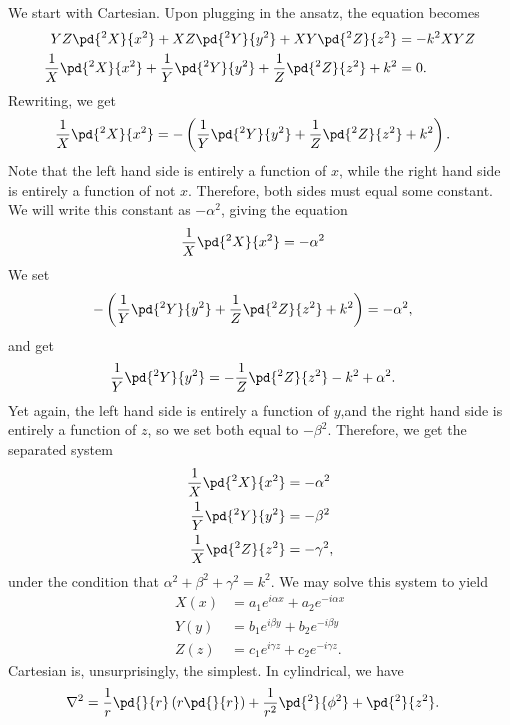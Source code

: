 \documentclass[10pt]{mypackage}
\begin{document}
  We start with Cartesian. Upon plugging in the ansatz, the equation becomes
  \begin{align*}
    YZ\pd{^2X}{x^2} + XZ \pd{^2Y}{y^2} + XY \pd{^2Z}{z^2} &= -k^2XYZ\\
    \frac{1}{X}\pd{^2X}{x^2} + \frac{1}{Y}\pd{^2Y}{y^2} + \frac{1}{Z}\pd{^2Z}{z^2} + k^2 &= 0.
  \end{align*}
  Rewriting, we get
  \begin{align*}
    \frac{1}{X}\pd{^2X}{x^2} &= -\left( \frac{1}{Y}\pd{^2Y}{y^2} + \frac{1}{Z}\pd{^2Z}{z^2} + k^2 \right).
  \end{align*}
  Note that the left hand side is entirely a function of $x$, while the right hand side is entirely a function of not $x$. Therefore, both sides must equal some constant. We will write this constant as $-\alpha^2$, giving the equation
  \begin{align*}
    \frac{1}{X}\pd{^2X}{x^2} &= -\alpha^2
  \end{align*}
  We set
  \begin{align*}
    -\left( \frac{1}{Y}\pd{^2Y}{y^2} + \frac{1}{Z}\pd{^2Z}{z^2} + k^2 \right) &= -\alpha^2,
  \end{align*}
  and get
  \begin{align*}
    \frac{1}{Y} \pd{^2Y}{y^2} &= -\frac{1}{Z}\pd{^2Z}{z^2} - k^2 + \alpha^2.
  \end{align*}
  Yet again, the left hand side is entirely a function of $y$,and the right hand side is entirely a function of $z$, so we set both equal to $-\beta^2$. Therefore, we get the separated system
  \begin{align*}
    \frac{1}{X}\pd{^2X}{x^2} &= -\alpha^2\\
    \frac{1}{Y}\pd{^2Y}{y^2} &= -\beta^2\\
    \frac{1}{X}\pd{^2Z}{z^2} &= -\gamma^2,
  \end{align*}
  under the condition that $\alpha^2 + \beta^2 + \gamma^2 = k^2$. We may solve this system to yield
  \begin{align*}
    X(x) &= a_1e^{i\alpha x} + a_2e^{-i\alpha x}\\
    Y(y) &= b_1e^{i\beta y} + b_2e^{-i\beta y}\\
    Z(z) &= c_1e^{i\gamma z} + c_2e^{-i\gamma z}.
  \end{align*}
  Cartesian is, unsurprisingly, the simplest. In cylindrical, we have
  \begin{align*}
    \nabla^2 &= \frac{1}{r} \pd{}{r}\left( r \pd{}{r} \right) + \frac{1}{r^2} \pd{^2}{\phi^2} + \pd{^2}{z^2}.
  \end{align*}
\end{document}

